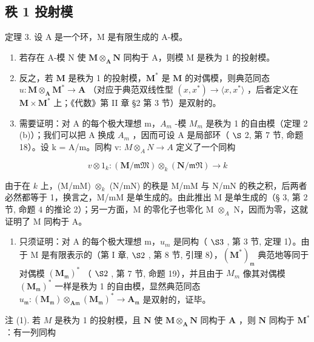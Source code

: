 \subsection{秩 1 投射模}

定理 3. 设 A 是一个环，M 是有限生成的 A-模。

\begin{enumerate}
\def\labelenumi{(\roman{enumi})}
\item
  若存在 A-模 N 使 \(\mathbf{M} \otimes_{\mathbf{A}} \mathbf{N}\) 同构于 A，则模 M 是秩为 1 的投射模。
\item
  反之，若 \(\mathbf{M}\) 是秩为 1 的投射模，\(\mathbf{M}^*\) 是 \(\mathbf{M}\) 的对偶模，则典范同态 \(u: \mathbf{M} \otimes_{\mathbf{A}} \mathbf{M}^* \to \mathbf{A}\) （对应于典范双线性型 \((x, x^*) \to \langle x, x^* \rangle\) ，后者定义在 \(\mathbf{M} \times \mathbf{M}^*\) 上；《代数》第 II 章 §2 第 3 节）是双射的。
\item
  需要证明：对 A 的每个极大理想 m，\(A_{m}\) -模 \(M_{m}\) 是秩为 1 的自由模（定理 2 (b)）；我们可以把 A 换成 \(A_{m}\) ，因而可设 A 是局部环（ \(\S\) 2, 第 7 节, 命题 18）。设 k = A/m。同构 v: \(M \otimes_{A} N \to A\) 定义了一个同构
\end{enumerate}

\[
v \otimes 1 _ {k} \colon (\mathbf {M} / \mathfrak {m M}) \otimes_ {k} (\mathbf {N} / \mathfrak {m N}) \rightarrow k
\]

由于在 \(k\) 上，(M/mM) \(\otimes_k\) (N/mN) 的秩是 M/mM 与 N/mN 的秩之积，后两者必然都等于 1，换言之，M/mM 是单生成的。由此推出 M 是单生成的（§ 3, 第 2 节, 命题 4 的推论 2）；另一方面，M 的零化子也零化 M \(\otimes_A\) N，因而为零，这就证明了 M 同构于 A。

\begin{enumerate}
\def\labelenumi{(\roman{enumi})}
\setcounter{enumi}{1}
\tightlist
\item
  只须证明：对 A 的每个极大理想 m，\(u_{m}\) 是同构（ \(\S 3\) , 第 3 节, 定理 1）。由于 M 是有限表示的（第 I 章, \(\S 2\) , 第 8 节, 引理 8），\((\mathbf{M}^{*})_{\mathfrak{m}}\) 典范地等同于对偶模 \((\mathbf{M}_{\mathfrak{m}})^{*}\) （ \(\S 2\) , 第 7 节, 命题 19），并且由于 \(M_{m}\) 像其对偶模 \((\mathbf{M}_{\mathfrak{m}})^{*}\) 一样是秩为 1 的自由模，显然典范同态 \(u_{\mathfrak{m}}: (\mathbf{M}_{\mathfrak{m}}) \otimes_{\mathbf{A}\mathfrak{m}} (\mathbf{M}_{\mathfrak{m}})^{*} \to \mathbf{A}_{\mathfrak{m}}\) 是双射的，证毕。
\end{enumerate}

注 (1). 若 \(M\) 是秩为 1 的投射模，且 \(\mathbf{N}\) 使 \(\mathbf{M} \otimes_{\mathbf{A}} \mathbf{N}\) 同构于 \(\mathbf{A}\) ，则 \(\mathbf{N}\) 同构于 \(\mathbf{M}^*\) ：有一列同构


